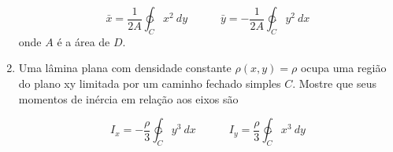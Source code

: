 \documentclass[11pt,a4paper]{article}
\begin{document}
\begin{enumerate}
$$\bar{x} = \displaystyle\dfrac{1}{2A}\ointctrclockwise_C x^2 \ dy \quad \quad \quad \bar{y} = - \displaystyle\dfrac{1}{2A}\ointctrclockwise_C y^2 \ dx$$ onde $A$ é a área de $D$.

\item Uma lâmina plana com densidade constante $\rho(x,y) = \rho$ ocupa uma região do plano xy limitada por um caminho fechado simples $C$. Mostre que seus momentos de inércia em relação aos eixos são

$$I_x = - \displaystyle\dfrac{\rho}{3}\ointctrclockwise_C y^3 \ dx \quad \quad \quad I_y = \displaystyle\dfrac{\rho}{3}\ointctrclockwise_C x^3 \ dy$$ 
	
\end{enumerate}		
	
\end{document}
